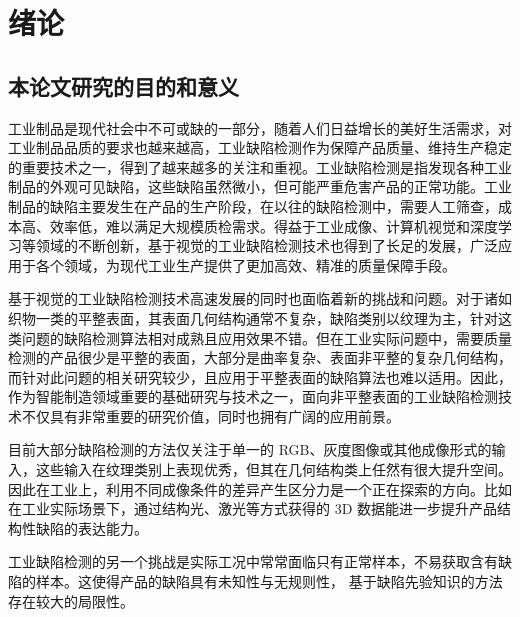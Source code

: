 %
%
%
%

\chapter{绪论}

\section{本论文研究的目的和意义}
工业制品是现代社会中不可或缺的一部分，随着人们日益增长的美好生活需求，对工业制品品质的要求也越来越高，工业缺陷检测作为保障产品质量、维持生产稳定的重要技术之一，得到了越来越多的关注和重视。工业缺陷检测是指发现各种工业制品的外观可见缺陷，这些缺陷虽然微小，但可能严重危害产品的正常功能。工业制品的缺陷主要发生在产品的生产阶段，在以往的缺陷检测中，需要人工筛查，成本高、效率低，难以满足大规模质检需求。得益于工业成像、计算机视觉和深度学习等领域的不断创新，基于视觉的工业缺陷检测技术也得到了长足的发展，广泛应用于各个领域，为现代工业生产提供了更加高效、精准的质量保障手段。

基于视觉的工业缺陷检测技术高速发展的同时也面临着新的挑战和问题。对于诸如织物一类的平整表面，其表面几何结构通常不复杂，缺陷类别以纹理为主，针对这类问题的缺陷检测算法相对成熟且应用效果不错。但在工业实际问题中，需要质量检测的产品很少是平整的表面，大部分是曲率复杂、表面非平整的复杂几何结构，而针对此问题的相关研究较少，且应用于平整表面的缺陷算法也难以适用。因此，作为智能制造领域重要的基础研究与技术之一，面向非平整表面的工业缺陷检测技术不仅具有非常重要的研究价值，同时也拥有广阔的应用前景。

目前大部分缺陷检测的方法仅关注于单一的 RGB、灰度图像或其他成像形式的输入，这些输入在纹理类别上表现优秀，但其在几何结构类上任然有很大提升空间。因此在工业上，利用不同成像条件的差异产生区分力是一个正在探索的方向。比如在工业实际场景下，通过结构光、激光等方式获得的 3D 数据能进一步提升产品结构性缺陷的表达能力。

工业缺陷检测的另一个挑战是实际工况中常常面临只有正常样本，不易获取含有缺陷的样本。这使得产品的缺陷具有未知性与无规则性， 基于缺陷先验知识的方法存在较大的局限性。

